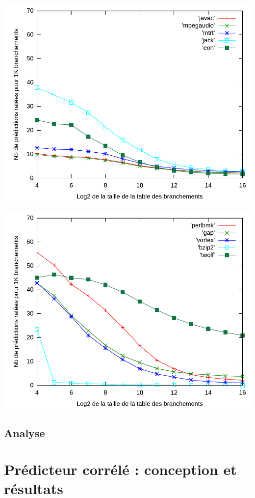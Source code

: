 \documentclass[a4paper]{article}
\begin{document}
\begin{minipage}{.48\linewidth}
\includegraphics[width=\linewidth]{../figures-gshare/gshare-2}
\end{minipage}%
\hfill
\begin{minipage}{.48\linewidth}
\includegraphics[width=\linewidth]{../figures-gshare/gshare-3}
\end{minipage}
\subsection{Analyse}

\section{Prédicteur corrélé : conception et résultats}
\end{document}
